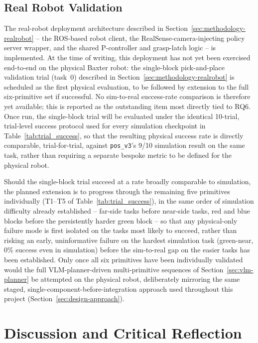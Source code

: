 \documentclass[12pt]{article}
\begin{document}
\subsection{Real Robot Validation}
\label{sec:results-realrobot}

The real-robot deployment architecture described in Section~\ref{sec:methodology-realrobot} -- the ROS-based robot client, the RealSense-camera-injecting policy server wrapper, and the shared P-controller and grasp-latch logic -- is implemented. At the time of writing, this deployment has not yet been exercised end-to-end on the physical Baxter robot: the single-block pick-and-place validation trial (task~0) described in Section~\ref{sec:methodology-realrobot} is scheduled as the first physical evaluation, to be followed by extension to the full six-primitive set if successful. No sim-to-real success-rate comparison is therefore yet available; this is reported as the outstanding item most directly tied to RQ6. Once run, the single-block trial will be evaluated under the identical 10-trial, trial-level success protocol used for every simulation checkpoint in Table~\ref{tab:trial_success}, so that the resulting physical success rate is directly comparable, trial-for-trial, against \texttt{pos\_v3}'s 9/10 simulation result on the same task, rather than requiring a separate bespoke metric to be defined for the physical robot.

Should the single-block trial succeed at a rate broadly comparable to simulation, the planned extension is to progress through the remaining five primitives individually (T1--T5 of Table~\ref{tab:trial_success}), in the same order of simulation difficulty already established -- far-side tasks before near-side tasks, red and blue blocks before the persistently harder green block -- so that any physical-only failure mode is first isolated on the tasks most likely to succeed, rather than risking an early, uninformative failure on the hardest simulation task (green-near, 0\% success even in simulation) before the sim-to-real gap on the easier tasks has been established. Only once all six primitives have been individually validated would the full VLM-planner-driven multi-primitive sequences of Section~\ref{sec:vlm-planner} be attempted on the physical robot, deliberately mirroring the same staged, single-component-before-integration approach used throughout this project (Section~\ref{sec:design-approach}).

\section{Discussion and Critical Reflection}
\label{sec:discussion}
\end{document}
